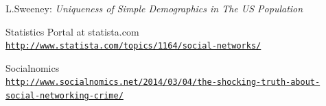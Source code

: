 \documentclass[12pt,conference]{IEEEtran}
\begin{document}
\begin{thebibliography}{1}
L.Sweeney: 
\textit{Uniqueness of Simple Demographics in The US Population}

Statistics Portal at statista.com
\\\texttt{\url{http://www.statista.com/topics/1164/social-networks/}}

Socialnomics
\\\texttt{\url{http://www.socialnomics.net/2014/03/04/the-shocking-truth-about-social-networking-crime/}}




%
%


%


\end{thebibliography}
\end{document}
